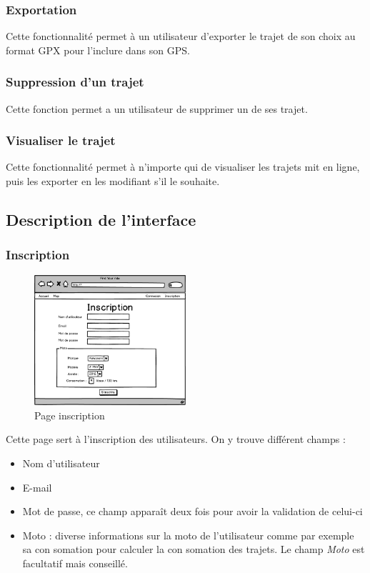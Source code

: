 \documentclass[a4paper]{article}
\begin{document}
\subsubsection{Exportation}
Cette fonctionnalité permet à un utilisateur d'exporter le trajet de son choix au format GPX pour l'inclure dans son GPS.

\subsubsection{Suppression d'un trajet}
Cette fonction permet a un utilisateur de supprimer un de ses trajet.

\subsubsection{Visualiser le trajet}
Cette fonctionnalité permet à n'importe qui de visualiser les trajets mit en ligne, puis les exporter en les modifiant s'il le souhaite.

\newpage

\subsection{Description de l'interface}

\subsubsection{Inscription}
\begin{figure}[h]
\centering
\includegraphics[width=0.5\textwidth]{./Images/Interfaces/inscription.png}
\caption{Page inscription}
\end{figure}

Cette page sert à l'inscription des utilisateurs. On y trouve différent champs : 
\begin{itemize}
    \item Nom d'utilisateur
    \item E-mail
    \item Mot de passe, ce champ apparaît deux fois pour avoir la validation de celui-ci
    \item Moto : diverse informations sur la moto de l'utilisateur comme par exemple sa con somation pour calculer la con somation des trajets. Le champ \emph{Moto} est facultatif mais conseillé.
\end{itemize}
\end{document}
